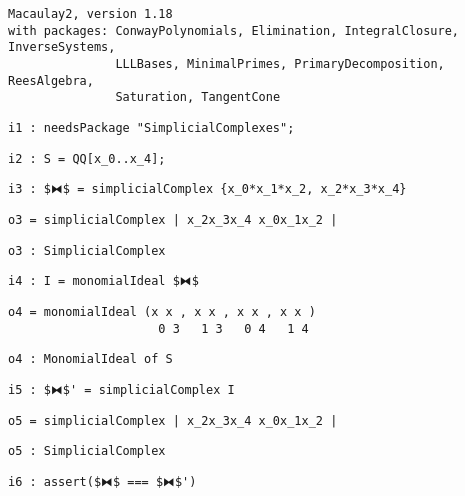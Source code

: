 \documentclass[12pt,leqno]{amsart}
\theoremstyle{definition}
\begin{document}
\begin{lstlisting}[xleftmargin=10pt, lineskip=-5pt, aboveskip=5.0pt, belowskip=1.5pt]
Macaulay2, version 1.18
with packages: ConwayPolynomials, Elimination, IntegralClosure, InverseSystems, 
               LLLBases, MinimalPrimes, PrimaryDecomposition, ReesAlgebra, 
               Saturation, TangentCone
\end{lstlisting}
\begin{lstlisting}[xleftmargin=10pt, aboveskip=1.5pt, belowskip=1.5pt]
i1 : needsPackage "SimplicialComplexes";
\end{lstlisting}
\begin{lstlisting}[xleftmargin=10pt, aboveskip=1.5pt, belowskip=1.5pt]
i2 : S = QQ[x_0..x_4];
\end{lstlisting}
\begin{lstlisting}[xleftmargin=10pt, aboveskip=1.5pt, belowskip=1.5pt]
i3 : $⧓$ = simplicialComplex {x_0*x_1*x_2, x_2*x_3*x_4}
\end{lstlisting}
\begin{lstlisting}[xleftmargin=10pt, aboveskip=1.5pt, belowskip=1.5pt]
o3 = simplicialComplex | x_2x_3x_4 x_0x_1x_2 |
\end{lstlisting}
\begin{lstlisting}[xleftmargin=10pt, aboveskip=1.5pt, belowskip=1.5pt]
o3 : SimplicialComplex
\end{lstlisting}
\begin{lstlisting}[xleftmargin=10pt, aboveskip=1.5pt, belowskip=1.5pt]
i4 : I = monomialIdeal $⧓$
\end{lstlisting}
\begin{lstlisting}[xleftmargin=10pt, lineskip=-10pt, aboveskip=4pt, belowskip=1.5pt]
o4 = monomialIdeal (x x , x x , x x , x x )
                     0 3   1 3   0 4   1 4
\end{lstlisting}
\begin{lstlisting}[xleftmargin=10pt, aboveskip=1.5pt, belowskip=1.5pt]
o4 : MonomialIdeal of S
\end{lstlisting}
\begin{lstlisting}[xleftmargin=10pt, aboveskip=1.5pt, belowskip=1.5pt]
i5 : $⧓$' = simplicialComplex I
\end{lstlisting}
\begin{lstlisting}[xleftmargin=10pt, aboveskip=1.5pt, belowskip=1.5pt]
o5 = simplicialComplex | x_2x_3x_4 x_0x_1x_2 |
\end{lstlisting}
\begin{lstlisting}[xleftmargin=10pt, aboveskip=1.5pt, belowskip=1.5pt]
o5 : SimplicialComplex
\end{lstlisting}
\begin{lstlisting}[xleftmargin=10pt, aboveskip=1.5pt, belowskip=3.0pt]
i6 : assert($⧓$ === $⧓$')
\end{lstlisting}
\end{document}
